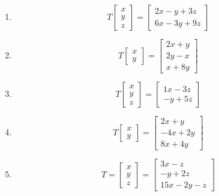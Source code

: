 \begin{resuelto}
\begin{enumerate}
\item$$
T\begin{bmatrix}
  x \\ y \\z
 \end{bmatrix}
 =\begin{bmatrix}
   2x-y+3z \\ 6x -3y +9z
  \end{bmatrix}
$$

\item $$
T\begin{bmatrix}
  x \\ y
 \end{bmatrix}
 =\begin{bmatrix}
2x+y \\ 2y-x \\ x+8y
  \end{bmatrix}
$$
\item
$$
T\begin{bmatrix}
  x\\y\\z
 \end{bmatrix}
=\begin{bmatrix}
  1x  -3z \\
   -y + 5z
 \end{bmatrix}
$$
\item
$$
T\begin{bmatrix}
  x \\ y
 \end{bmatrix}
=\begin{bmatrix}
  2x+y\\
  -4x + 2y \\
  8x + 4y
 \end{bmatrix}
$$
\item
$$
T=\begin{bmatrix}
   x\\y\\z
  \end{bmatrix}
=\begin{bmatrix}
  3x  -z \\
  -y + 2z \\
  15x  -2y  -z
 \end{bmatrix}
$$


%
\end{enumerate}
\end{resuelto}


